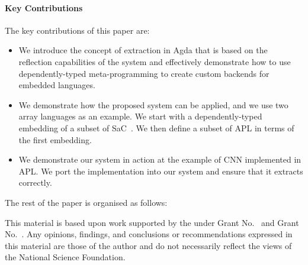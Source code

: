 \documentclass[acmsmall,review,anonymous]{acmart}\settopmatter{printfolios=true,printccs=false,printacmref=false}
\begin{document}
\paragraph{Key Contributions}
The key contributions of this paper are:
\begin{itemize}
    \item We introduce the concept of extraction in Agda that is based on the
            reflection capabilities of the system and effectively demonstrate
            how to use dependently-typed meta-programming to create custom
            backends for embedded languages.
    \item We demonstrate how the proposed system can be applied, and we use
            two array languages as an example.  We start with a dependently-typed
            embedding of a subset of SaC~\cite{}.  We then define a subset of APL
            in terms of the first embedding.
    \item We demonstrate our system in action at the example of CNN implemented
            in APL.  We port the implementation into our system and ensure that
            it extracts correctly.
\end{itemize}

The rest of the paper is organised as follows:











\begin{acks}                            %
  This material is based upon work supported by the
   under Grant
  No.~ and Grant
  No.~.  Any opinions, findings, and
  conclusions or recommendations expressed in this material are those
  of the author and do not necessarily reflect the views of the
  National Science Foundation.
\end{acks}



\end{document}

